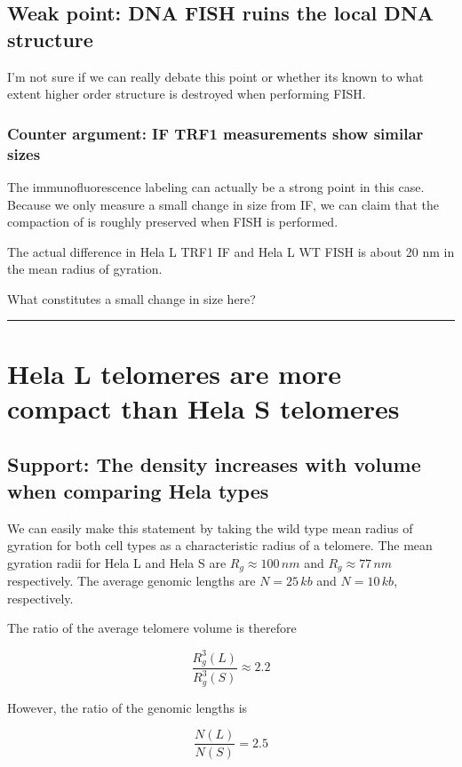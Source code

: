 \documentclass[12pt, a4paper]{article}
\begin{document}
\subsection{Weak point: DNA FISH ruins the local DNA structure}
\label{sec-1-8}
I'm not sure if we can really debate this point or whether its
known to what extent higher order structure is destroyed when
performing FISH.

\subsubsection{Counter argument: IF TRF1 measurements show similar sizes}
\label{sec-1-8-1}
The immunofluorescence labeling can actually be a strong point in
this case. Because we only measure a small change in size from IF,
we can claim that the compaction of is roughly preserved when FISH
is performed.

The actual difference in Hela L TRF1 IF and Hela L WT FISH is
about 20 nm in the mean radius of gyration.

What constitutes a small change in size here?

\rule{\linewidth}{0.5pt}
\section{Hela L telomeres are more compact than Hela S telomeres}
\label{sec-2}
\subsection{Support: The density increases with volume when comparing Hela types}
\label{sec-2-1}
We can easily make this statement by taking the wild type mean
radius of gyration for both cell types as a characteristic radius
of a telomere. The mean gyration radii for Hela L and Hela S are
$R_g \approx 100 \, nm$ and $R_g \approx 77 \, nm$
respectively. The average genomic lengths are $N = 25 \, kb$ and $N
   = 10 \, kb$, respectively.

The ratio of the average telomere volume is therefore

   \begin{equation*}
\frac{R_g^3 \left( L \right)}{R_g^3 \left( S \right)} \approx 2.2
   \end{equation*}

However, the ratio of the genomic lengths is

   \begin{equation*}
\frac{N \left( L \right)}{N \left( S \right)} = 2.5
   \end{equation*}
\end{document}
